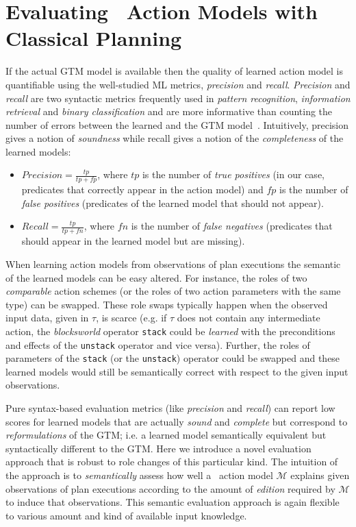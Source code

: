\section{Evaluating \strips\ Action Models with Classical Planning}
\label{sec:evaluation}

If the actual GTM model is available then the quality of learned action model is quantifiable using the well-studied ML metrics, {\em precision} and {\em recall}. {\em Precision} and {\em recall} are two syntactic metrics frequently used in {\em pattern recognition}, {\em information retrieval} and {\em binary classification} and are more informative than counting the number of errors between the learned and the GTM model~\cite{davis2006relationship}. Intuitively, precision gives a notion of {\em soundness} while recall gives a notion of the {\em completeness} of the learned models:
\begin{itemize}
\item $Precision=\frac{tp}{tp+fp}$, where $tp$ is the number of {\em true positives} (in our case, predicates that correctly appear in the action model) and $fp$ is the number of {\em false positives} (predicates of the learned model that should not appear).
\item $Recall=\frac{tp}{tp+fn}$, where $fn$ is the number of {\em false negatives} (predicates that should appear in the learned model but are missing).
\end{itemize}

When learning action models from observations of plan executions the semantic of the learned models can be easy altered. For instance, the roles of two {\em comparable} action schemes (or the roles of two action parameters with the same type) can be swapped. These role swaps typically happen when the observed input data, given in $\tau$, is scarce (e.g. if $\tau$ does not contain any intermediate action, the {\em blocksworld} operator {\small\tt stack} could be {\em learned} with the preconditions and effects of the {\small\tt unstack} operator and vice versa). Further, the roles of parameters of the {\small\tt stack} (or the {\small\tt unstack}) operator could be swapped and these learned models would still be semantically correct with respect to the given input observations.

Pure syntax-based evaluation metrics (like {\em precision} and {\em recall}) can report low scores for learned models that are actually {\em sound} and {\em complete} but correspond to {\em reformulations} of the GTM; i.e. a learned model semantically equivalent but syntactically different to the GTM. Here we introduce a novel evaluation approach that is robust to role changes of this particular kind. The intuition of the approach is to {\em semantically} assess how well a \strips\ action model $\mathcal{M}$ explains given observations of plan executions according to the amount of {\em edition} required by $\mathcal{M}$ to induce that observations. This semantic evaluation approach is again flexible to various amount and kind of available input knowledge.

